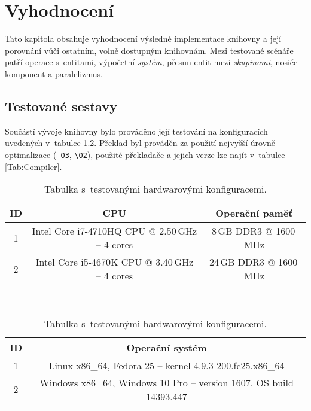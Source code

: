 

\chapter{Vyhodnocení}
\label{Chap:Results}


Tato kapitola obsahuje vyhodnocení výsledné implementace knihovny  a její porovnání vůči ostatním, volně dostupným knihovnám. Mezi testované scénáře patří operace s~entitami, výpočetní \emph{systém}, přesun entit mezi \emph{skupinami}, nosiče komponent a paralelizmus.

\section{Testované sestavy}

Součástí vývoje knihovny bylo prováděno její testování na konfiguracích uvedených v~tabulce \ref{Tab:HW}. Překlad byl prováděn za použití nejvyšší úrovně optimalizace (\verb|-O3|, \verb|\O2|), použité překladače a jejich verze lze najít v~tabulce \ref{Tab:Compiler}. 

\begin{table}[H]
	\begin{center}
		\begin{tabular}{| c | c | c |}
			\hline
			\textbf{ID} & \textbf{CPU} & \textbf{Operační paměť} \\
			\hline
			1 & Intel Core i7-4710HQ CPU @ 2.50\,GHz -- 4 cores & 8\,GB DDR3 @ 1600\,MHz \\
			\hline
			2 & Intel Core i5-4670K CPU @ 3.40\,GHz -- 4 cores & 24\,GB DDR3 @ 1600\,MHz \\
			\hline
		\end{tabular}\\[1em]
		\begin{tabular}{| c | c |}
			\hline
			\textbf{ID} & \textbf{Operační systém} \\
			\hline
			1 & Linux x86\_64, Fedora 25 -- kernel 4.9.3-200.fc25.x86\_64 \\
			\hline
			2 & Windows x86\_64, Windows 10 Pro -- version 1607, OS build 14393.447 \\
			\hline
		\end{tabular}
		\caption{Tabulka s~testovanými hardwarovými konfiguracemi.}
		\label{Tab:HW}
	\end{center}
\end{table}

